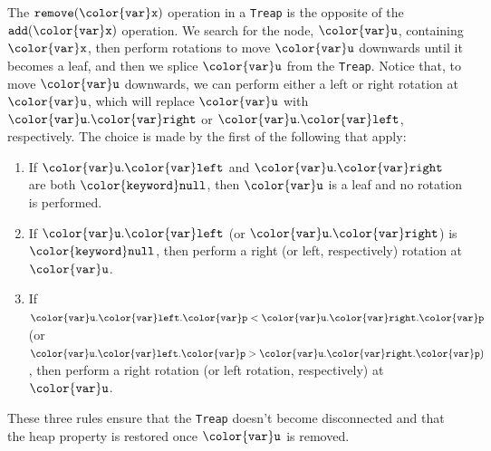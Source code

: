 \documentclass[10pt]{book}
\theoremstyle{plain}
\theoremstyle{definition}
\begin{document}
The \ensuremath{\mathtt{remove({\color{var}x})}} operation in a \texttt{Treap} is the opposite of the \ensuremath{\mathtt{add({\color{var}x})}}
operation.  We search for the node, \ensuremath{\mathtt{{\color{var}u}}}, containing \ensuremath{\mathtt{{\color{var}x}}}, then perform
rotations to move \ensuremath{\mathtt{{\color{var}u}}} downwards until it becomes a leaf, and then we
splice \ensuremath{\mathtt{{\color{var}u}}} from the \texttt{Treap}.  Notice that, to move \ensuremath{\mathtt{{\color{var}u}}} downwards, we can
perform either a left or right rotation at \ensuremath{\mathtt{{\color{var}u}}}, which will replace \ensuremath{\mathtt{{\color{var}u}}}
with \ensuremath{\mathtt{{\color{var}u}.{\color{var}right}}} or \ensuremath{\mathtt{{\color{var}u}.{\color{var}left}}}, respectively.
The choice is made by the first of the following that apply:
\begin{enumerate}
\item If \ensuremath{\mathtt{{\color{var}u}.{\color{var}left}}} and \ensuremath{\mathtt{{\color{var}u}.{\color{var}right}}} are both \ensuremath{\mathtt{{\color{keyword}null}}}, then \ensuremath{\mathtt{{\color{var}u}}} is a leaf and no rotation is performed.
\item If \ensuremath{\mathtt{{\color{var}u}.{\color{var}left}}} (or \ensuremath{\mathtt{{\color{var}u}.{\color{var}right}}}) is \ensuremath{\mathtt{{\color{keyword}null}}}, then perform a right (or left, respectively) rotation at \ensuremath{\mathtt{{\color{var}u}}}.
\item If $\ensuremath{\mathtt{{\color{var}u}.{\color{var}left}.{\color{var}p}}} < \ensuremath{\mathtt{{\color{var}u}.{\color{var}right}.{\color{var}p}}}$ (or $\ensuremath{\mathtt{{\color{var}u}.{\color{var}left}.{\color{var}p}}} > \ensuremath{\mathtt{{\color{var}u}.{\color{var}right}.{\color{var}p}}})$, then perform a right rotation (or left rotation, respectively) at \ensuremath{\mathtt{{\color{var}u}}}.
\end{enumerate}
These three rules ensure that the \texttt{Treap} doesn't become disconnected and that the heap property is restored once \ensuremath{\mathtt{{\color{var}u}}} is removed.
\end{document}
